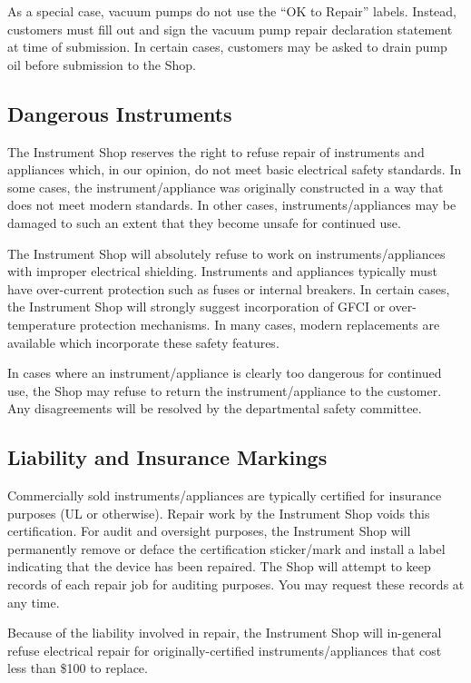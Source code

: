\documentclass{training}
\begin{document}
As a special case, vacuum pumps do not use the “OK to Repair” labels.
Instead, customers must fill out and sign the vacuum pump repair declaration statement at time of submission.
In certain cases, customers may be asked to drain pump oil before submission to the Shop.

\subsection{Dangerous Instruments}

The Instrument Shop reserves the right to refuse repair of instruments and appliances which, in our opinion, do not meet basic electrical safety standards.
In some cases, the instrument/appliance was originally constructed in a way that does not meet modern standards.
In other cases, instruments/appliances may be damaged to such an extent that they become unsafe for continued use.

The Instrument Shop will absolutely refuse to work on instruments/appliances with improper electrical shielding.
Instruments and appliances typically must have over-current protection such as fuses or internal breakers.
In certain cases, the Instrument Shop will strongly suggest incorporation of GFCI or over-temperature
protection mechanisms.
In many cases, modern replacements are available which incorporate these safety features.

In cases where an instrument/appliance is clearly too dangerous for continued use, the Shop may refuse to return the instrument/appliance to the customer.
Any disagreements will be resolved by the departmental safety committee.

\subsection{Liability and Insurance Markings}

Commercially sold instruments/appliances are typically certified for insurance purposes (UL or otherwise).
Repair work by the Instrument Shop voids this certification.
For audit and oversight purposes, the Instrument Shop will permanently remove or deface the certification sticker/mark and install a label indicating that the device has been repaired.
The Shop will attempt to keep records of each repair job for auditing purposes.
You may request these records at any time.

Because of the liability involved in repair, the Instrument Shop will in-general refuse electrical repair for originally-certified instruments/appliances that cost less than \$100 to replace.
\end{document}

